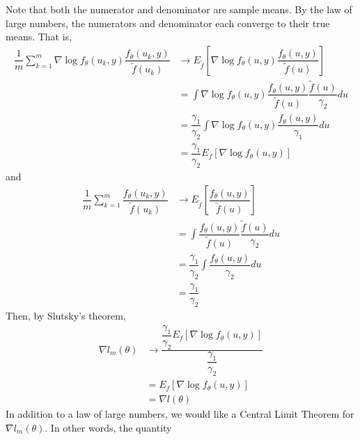 \documentclass{article}
\begin{document}
 Note that both the numerator and denominator are sample means. By the law of large numbers, the numerators and denominator  each converge to their true means. That is,
\begin{align}
\dfrac{1}{m}\sum_{k=1}^m \nabla \log f_\theta (u_k,y)  \dfrac{f_\theta(u_k,y)}{\tilde{f}(u_k)} &\rightarrow  E_{\tilde{f}} \left[ \nabla \log f_\theta (u,y)  \dfrac{f_\theta(u,y)}{\tilde{f}(u)}  \right] \\
&= \int \nabla \log f_\theta (u,y)  \dfrac{f_\theta(u,y)}{\tilde{f}(u)} \dfrac{\tilde{f}(u)}{\gamma_2} du\\
&= \dfrac{\gamma_1}{\gamma_2} \int \nabla \log f_\theta (u,y)  \dfrac{f_\theta(u,y)}{\gamma_1}  du \\
&=\dfrac{\gamma_1}{\gamma_2} E_f \left[ \nabla \log f_\theta(u,y)  \right]
\end{align}
and
\begin{align}
\dfrac{1}{m}\sum_{k=1}^m \dfrac{f_\theta(u_k,y)}{\tilde{f}(u_k)} &\rightarrow E_{\tilde{f}} \left[ \dfrac{f_\theta(u,y)}{\tilde{f}(u)}  \right] \\
&= \int \dfrac{f_\theta(u,y)}{\tilde{f}(u)} \dfrac{\tilde{f}(u)}{\gamma_2} du\\
&= \dfrac{\gamma_1}{\gamma_2} \int \dfrac{ f_\theta(u,y)}{\gamma_2} du \\
&= \dfrac{\gamma_1}{\gamma_2}
\end{align}
Then, by Slutsky's theorem,
\begin{align}
\nabla l_m(\theta)&\rightarrow \dfrac{  \dfrac{\gamma_1}{\gamma_2} E_f \left[ \nabla \log f_\theta(u,y)  \right] }{\dfrac{\gamma_1}{\gamma_2}}\\
&=  E_f \left[ \nabla \log f_\theta(u,y) \right] \\
&=\nabla l(\theta)
\end{align}
In addition to a law of large numbers, we would like a Central Limit Theorem for $\nabla l_m(\theta)$. In other words, the quantity
\end{document}
